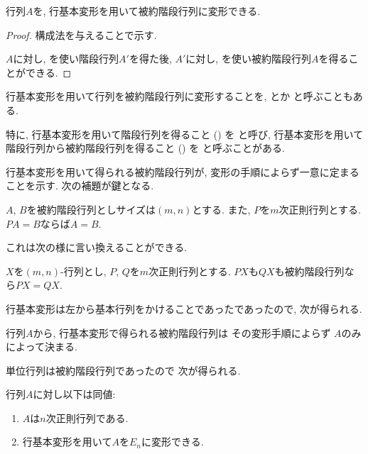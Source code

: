 \begin{cor}
  \label{thm:FB}
行列$A$を, 行基本変形を用いて被約階段行列に変形できる.
\end{cor}
\begin{proof}
    構成法を与えることで示す.
  
  $A$に対し,
  を使い階段行列$A'$を得た後,
  $A'$に対し, を使い被約階段行列$A$を得ることができる.
\end{proof}
\begin{remark}
  行基本変形を用いて行列を被約階段行列に変形することを,
  とか
  と呼ぶこともある.

  特に,
  行基本変形を用いて階段行列を得ること ()
  を
  と呼び,
  行基本変形を用いて階段行列から被約階段行列を得ること ()
  を
  と呼ぶことがある.  
\end{remark}




行基本変形を用いて得られる被約階段行列が,
変形の手順によらず一意に定まることを示す.
次の補題が鍵となる.
\begin{lemma}
  \label{lem:key:PX=Y:X=Y}
  $A$, $B$を被約階段行列としサイズは$(m,n)$とする.
  また, $P$を$m$次正則行列とする.
  $PA=B$ならば$A=B$.
\end{lemma}
これは次の様に言い換えることができる.
\begin{cor}
  \label{prop:reduced:PX=QX}
  $X$を$(m,n)$-行列とし,
  $P$, $Q$を$m$次正則行列とする.
  $PX$も$QX$も被約階段行列なら$PX=QX$.
\end{cor}
行基本変形は左から基本行列をかけることであったであったので,
次が得られる.
\begin{cor}
  行列$A$から,
  行基本変形で得られる被約階段行列は
  その変形手順によらず
  $A$のみによって決まる.
\end{cor}
単位行列は被約階段行列であったので
次が得られる.
\begin{cor}
  \label{thm:reg:criterion:rowtrans}
  \indexforcriterionofregularity%
  行列$A$に対し以下は同値:
  \begin{enumerate}
  \item
    \label{cor:reg:e:item:reg}
    $A$は$n$次正則行列である.
  \item
    \label{cor:reg:e:item:e}
    行基本変形を用いて$A$を$E_n$に変形できる.
  \end{enumerate}
\end{cor}


